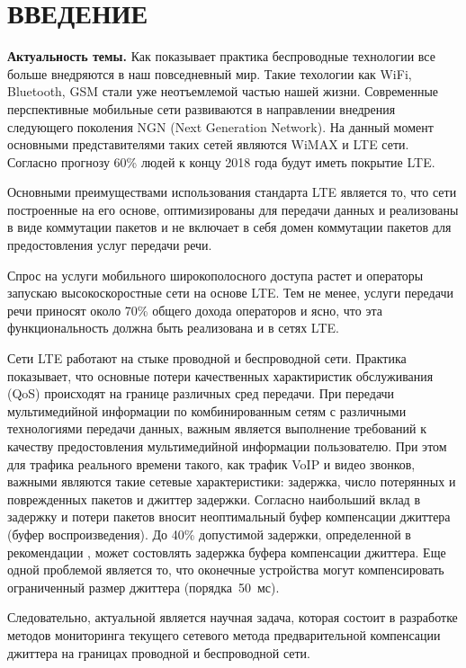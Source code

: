 \chapter*{ВВЕДЕНИЕ}							%

\textbf{Актуальность темы.} Как показывает практика беспроводные технологии все больше внедряются в наш повседневный мир. Такие техологии как WiFi, Bluetooth, GSM стали уже неотъемлемой частью нашей жизни. 
Современные перспективные мобильные сети развиваются в направлении внедрения следующего поколения NGN (Next Generation Network). На данный момент основными представителями таких сетей являются WiMAX и LTE сети.
Согласно прогнозу \cite{ericsson} 60\% людей к концу 2018 года будут иметь покрытие LTE.


Основными преимуществами использования стандарта LTE является то, что сети построенные на его основе, оптимизированы для передачи данных и реализованы в виде коммутации пакетов 
и не включает в себя домен коммутации пакетов для предостовления услуг передачи речи.

Спрос на услуги мобильного широкополосного доступа растет и операторы запускаю высокоскоростные сети на основе LTE. 
Тем не менее, услуги передачи речи приносят около 70\% общего дохода операторов и ясно, что эта функциональность должна быть реализована и в сетях LTE.

Сети LTE работают на стыке проводной и беспроводной сети. %
Практика показывает, что основные потери качественных характиристик обслуживания (QoS) происходят на границе различных сред передачи.
При передачи мультимедийной информации по комбинированным сетям с различными технологиями передачи данных, важным является выполнение требований к качеству предостовления мультимедийной информации пользователю.
При этом для трафика реального времени такого, как трафик VoIP и видео звонков, важными являются такие сетевые характеристики:
задержка, число потерянных и поврежденных пакетов и джиттер задержки.
Согласно \cite{rokovoy} наибольший вклад в задержку и потери пакетов вносит неоптимальный буфер компенсации джиттера (буфер воспроизведения). До 40\% допустимой задержки, определенной в рекомендации \cite{G114}, может состовлять задержка буфера компенсации джиттера.
Еще одной проблемой является то, что оконечные устройства могут компенсировать ограниченный размер джиттера (порядка~50~мс).

Следовательно, актуальной является научная задача, которая состоит в разработке методов мониторинга текущего сетевого метода предварительной компенсации джиттера на границах проводной и беспроводной сети.


